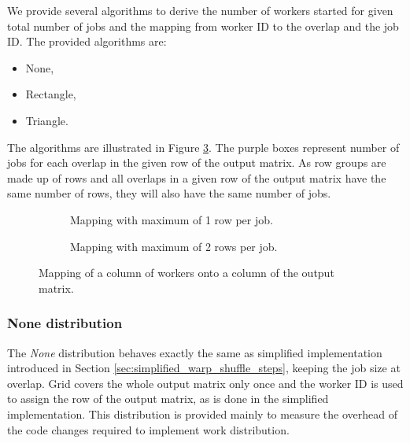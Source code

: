 We provide several algorithms to derive the number of workers started for given total number of jobs and the mapping from worker ID to the overlap and the job ID. The provided algorithms are:

\begin{itemize}
	\item None,
	\item Rectangle,
	\item Triangle.
\end{itemize}


The algorithms are illustrated in Figure \ref{fig:work_distribution_examples}. The purple boxes represent number of jobs for each overlap in the given row of the output matrix. As row groups are made up of rows and all overlaps in a given row of the output matrix have the same number of rows, they will also have the same number of jobs.

\begin{figure}[ht]
	\centering	
	\begin{subfigure}{0.7\textwidth}
	\centering
		\def\svgwidth{\textwidth}
		\fontsize{6}{8}\selectfont
		
		\caption{Mapping with maximum of 1 row per job.}
		\label{fig:work_dist_max_1}
	\end{subfigure}
	\hfill
	\begin{subfigure}{0.6\textwidth}
 		\centering
		\def\svgwidth{\textwidth}
		\fontsize{6}{8}\selectfont
		
		\caption{Mapping with maximum of 2 rows per job.}
		\label{fig:work_dist_max_2}
	\end{subfigure}
	
	\caption{Mapping of a column of workers onto a column of the output matrix.}
	\label{fig:work_distribution_examples}
\end{figure}


\subsubsection{None distribution}		
The \textit{None} distribution behaves exactly the same as simplified implementation introduced in Section \ref{sec:simplified_warp_shuffle_steps}, keeping the job size at overlap. Grid covers the whole output matrix only once and the worker ID is used to assign the row of the output matrix, as is done in the simplified implementation. This distribution is provided mainly to measure the overhead of the code changes required to implement work distribution. 

